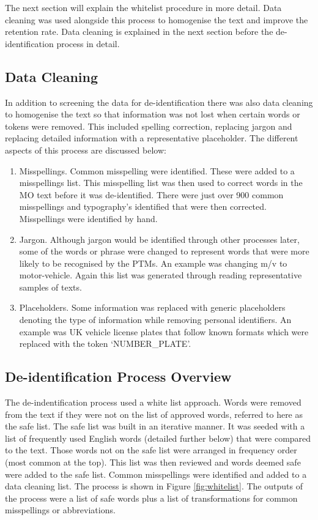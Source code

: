 The next section will explain the whitelist procedure in more detail. Data cleaning was used alongside this process to homogenise the text and improve the retention rate. Data cleaning is explained in the next section before the de-identification process in detail.

\subsection{Data Cleaning} In addition to screening the data for de-identification there was also data cleaning to homogenise the text so that information was not lost when certain words or tokens were removed. This included spelling correction, replacing jargon and replacing detailed information with a representative placeholder. The different aspects of this process are discussed below:

\begin{enumerate}
    \item{Misspellings.} Common misspelling were identified. These were added to a misspellings list. This misspelling list was then used to correct words in the MO text before it was de-identified. There were just over 900 common misspellings and typography's identified that were then corrected. Misspellings were identified by hand.
    
    \item{Jargon.} Although jargon would be identified through other processes later, some of the words or phrase were changed to represent words that were more likely to be recognised by the PTMs. An example was changing m/v to motor-vehicle. Again this list was generated through reading representative samples of texts.
    
    \item{Placeholders.} Some information was replaced with generic placeholders denoting the type of information while removing personal identifiers. An example was UK vehicle license plates that follow known formats which were replaced with the token ‘NUMBER\_PLATE’. 
\end{enumerate}


\subsection{De-identification Process Overview} The de-indentification process  used a white list approach. Words were removed from the text if they were not on the list of approved words, referred to here as the safe list. The safe list was built in an iterative manner.  It was seeded with  a list of  frequently used English words (detailed further below) that were compared to the text. Those words not on the safe list were arranged in frequency order (most common at the top). This list was then reviewed and words deemed safe were added to the safe list. Common misspellings were identified and added to a data cleaning list. The process is shown in Figure \ref{fig:whitelist}. The outputs of the process  were a list of safe words plus a list of transformations for common misspellings or abbreviations.



